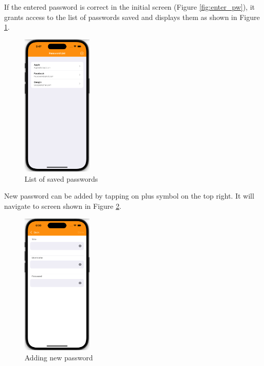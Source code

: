 \documentclass[10pt, titlepage]{article}
\begin{document}
If the entered password is correct in the initial screen (Figure \ref{fig:enter_pw}), it grants access to the list of passwords saved and displays them as shown in Figure \ref{fig:pw_list}.
\begin{figure}[H]
	\centering
	\vspace{-0.25em}
	\includegraphics[width=0.3\textwidth]{img/pw_list}
	\vspace{-0.75em}
	\caption{List of saved passwords}
	\label{fig:pw_list}
	\vspace{-0.75em}
\end{figure}
New password can be added by tapping on plus symbol on the top right. It will navigate to screen shown in Figure \ref{fig:add_pw}.
\begin{figure}[H]
	\centering
	\vspace{-0.25em}
	\includegraphics[width=0.3\textwidth]{img/add_pw}
	\vspace{-0.75em}
	\caption{Adding new password}
	\label{fig:add_pw}
	\vspace{-0.75em}
\end{figure}
\end{document}
